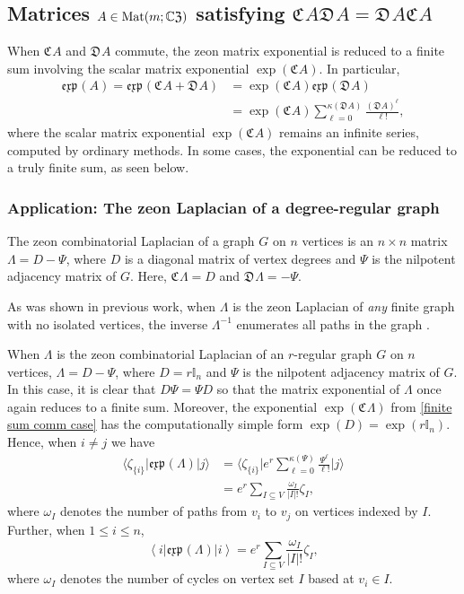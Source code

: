 \documentclass{article}
\theoremstyle{definition}
\newcommand{\zexp}{\mathfrak{exp}\mspace{1mu}}
\newcommand{\zco}{\mathfrak{C}\mspace{1mu}}
\newcommand{\zdu}{\mathfrak{D}\mspace{1mu}}
\newcommand{\CZ}{\mathbb{C}\mathfrak{Z}}
\newcommand{\Mat}{{\rm Mat}}
\newcommand{\mI}{\mathbb{I}}
\numberwithin{equation}{section}
\begin{document}
\subsection{Matrices $A\in\Mat(m;\CZ)$ satisfying $\zco A\zdu A=\zdu A\zco A$}

When $\zco A$ and $\zdu A$ commute, the zeon matrix exponential is reduced to a finite sum involving the scalar matrix exponential $\exp(\zco A)$.  In particular, 
\begin{align}\label{finite sum comm case}
\zexp(A)=\zexp(\zco A+\zdu A)&=\exp(\zco A)\zexp(\zdu A)\nonumber\\
&=\exp(\zco A)\sum_{\ell=0}^{\kappa(\zdu A)}\frac{(\zdu A)^\ell}{\ell!},
\end{align}
where the scalar matrix exponential $\exp(\zco A)$ remains an infinite series, computed by  ordinary methods.   In some cases, the exponential can be reduced to a truly finite sum, as seen below.

\subsubsection{Application: The zeon Laplacian of a degree-regular graph}

The zeon combinatorial Laplacian of a graph $G$ on $n$ vertices is an $n\times n$ matrix $\Lambda=D-\Psi$, where $D$ is a diagonal matrix of vertex degrees and $\Psi$ is the nilpotent adjacency matrix of $G$.   Here, $\zco\Lambda=D$ and $\zdu\Lambda=-\Psi$.

As was shown in previous work, when $\Lambda$ is the zeon Laplacian of {\em any} finite graph with no isolated vertices, the inverse $\Lambda^{-1}$ enumerates all paths in the graph \cite{zeon laplacian}.   

When $\Lambda$ is the zeon combinatorial Laplacian of an $r$-regular graph $G$ on $n$ vertices,  $\Lambda=D-\Psi$, where $D=r\mI_n$ and $\Psi$ is the nilpotent adjacency matrix of $G$.   In this case, it is clear that $D\Psi=\Psi D$ so that the matrix exponential of $\Lambda$ once again reduces to a finite sum.   Moreover, the exponential $\exp(\zco \Lambda)$ from \eqref{finite sum comm case} has the computationally simple form $\exp(D)=\exp(r\mI_n)$.  Hence, when $i\ne j$ we have \begin{align*}
\langle \zeta_{\{i\}}\vert \zexp(\Lambda)\vert j\rangle&=\langle \zeta_{\{i\}}\vert e^r\sum_{\ell=0}^{\kappa(\Psi)}\frac{\Psi^\ell}{\ell!}\vert j\rangle\\
&=e^r\sum_{I\subseteq V}\frac{\omega_I}{|I|!} \zeta_{I},\end{align*}
where $\omega_I$ denotes the number of paths from $v_i$ to $v_j$ on vertices indexed by $I$.  Further,  when $1\le i \le n$,
\begin{equation*}
\left<i\vert \zexp(\Lambda)\vert i\right>=e^r\sum_{I\subseteq V}\frac{\omega_I}{|I|!} \zeta_{I},\end{equation*}
where $\omega_I$ denotes the number of cycles on vertex set $I$ based at $v_i\in I$.  
\end{document}
